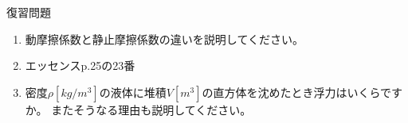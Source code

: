 \documentclass[12pt,a4paper]{jsarticle}
\begin{document}
復習問題
\begin{enumerate}
    \item 動摩擦係数と静止摩擦係数の違いを説明してください。
    \item エッセンスp.25の23番
    \item 密度$\rho\left[kg/m^3\right]$の液体に堆積$V[m^3]$の直方体を沈めたとき浮力はいくらですか。
    またそうなる理由も説明してください。
\end{enumerate}
\end{document}
